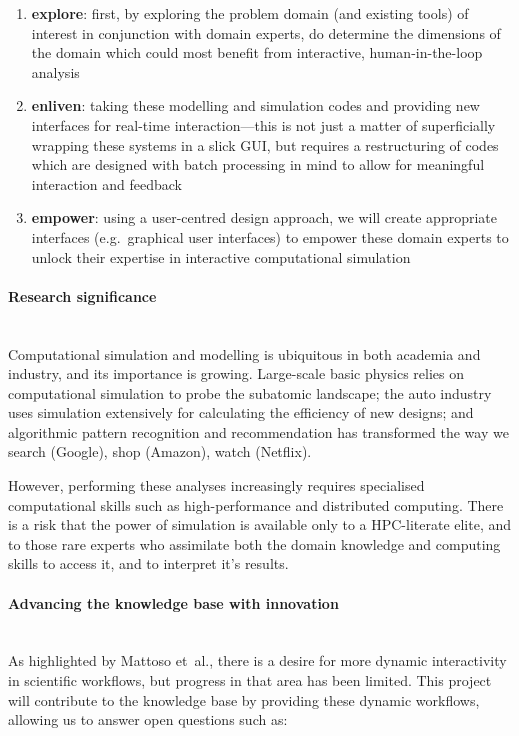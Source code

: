 \documentclass[a4paper,fontsize=12pt]{scrartcl}
\begin{document}
\begin{enumerate}
\item \textbf{explore}: first, by exploring the problem domain (and
  existing tools) of interest in conjunction with domain experts, do
  determine the dimensions of the domain which could most benefit from
  interactive, human-in-the-loop analysis
\item \textbf{enliven}: taking these modelling and simulation codes
  and providing new interfaces for real-time interaction---this is not
  just a matter of superficially wrapping these systems in a slick
  GUI, but requires a restructuring of codes which are designed with
  batch processing in mind to allow for meaningful interaction and
  feedback
\item \textbf{empower}: using a user-centred design approach, we will
  create appropriate interfaces (e.g.~graphical user interfaces) to
  empower these domain experts to unlock their expertise in
  interactive computational simulation
\end{enumerate}

\paragraph*{Research significance}\mbox{}\\


Computational simulation and modelling is ubiquitous in both academia
and industry, and its importance is growing. Large-scale basic physics
relies on computational simulation to probe the subatomic landscape;
the auto industry uses simulation extensively for calculating the
efficiency of new designs; and algorithmic pattern recognition and
recommendation has transformed the way we search (Google), shop
(Amazon), watch (Netflix).

However, performing these analyses increasingly requires specialised
computational skills such as high-performance and distributed
computing. There is a risk that the power of simulation is available
only to a HPC-literate elite, and to those rare experts who assimilate
both the domain knowledge and computing skills to access it, and to
interpret it's results.

\paragraph*{Advancing the knowledge base with innovation}\mbox{}\\

As highlighted by Mattoso et~al.\parencite{Mattoso}, there is a desire for
more dynamic interactivity in scientific workflows, but progress in
that area has been limited. This project will contribute to the
knowledge base by providing these dynamic workflows, allowing us to
answer open questions such as:
\end{document}
